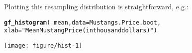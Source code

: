 \documentclass[11pt]{article}\usepackage[]{graphicx}\usepackage[]{color}
\makeatletter
\def\maxwidth{ %
  \ifdim\Gin@nat@width>\linewidth
    \linewidth
  \else
    \Gin@nat@width
  \fi
}
\newcommand{\hlstr}[1]{\textcolor[rgb]{0.192,0.494,0.8}{#1}}%
\newcommand{\hlopt}[1]{\textcolor[rgb]{0,0,0}{#1}}%
\newcommand{\hlstd}[1]{\textcolor[rgb]{0.345,0.345,0.345}{#1}}%
\newcommand{\hlkwc}[1]{\textcolor[rgb]{0.333,0.667,0.333}{#1}}%
\newcommand{\hlkwd}[1]{\textcolor[rgb]{0.737,0.353,0.396}{\textbf{#1}}}%
\newenvironment{kframe}{%
 \def\at@end@of@kframe{}%
 \ifinner\ifhmode%
  \def\at@end@of@kframe{\end{minipage}}%
  \begin{minipage}{\columnwidth}%
 \fi\fi%
 \def\FrameCommand##1{\hskip\@totalleftmargin \hskip-\fboxsep
 \colorbox{shadecolor}{##1}\hskip-\fboxsep
     \hskip-\linewidth \hskip-\@totalleftmargin \hskip\columnwidth}%
 \MakeFramed {\advance\hsize-\width
   \@totalleftmargin\z@ \linewidth\hsize
   \@setminipage}}%
 {\par\unskip\endMakeFramed%
 \at@end@of@kframe}
\newenvironment{knitrout}{}{} %
\makeatother
\begin{document}
Plotting this resampling distribution is straightforward, e.g.:
\begin{knitrout}
\color{fgcolor}\begin{kframe}
\begin{alltt}
\hlkwd{gf_histogram}\hlstd{(}\hlopt{~} \hlstd{mean,} \hlkwc{data} \hlstd{= Mustangs.Price.boot,}
  \hlkwc{xlab}\hlstd{=}\hlstr{"Mean Mustang Price (in thousand dollars)"}\hlstd{)}
\end{alltt}
\end{kframe}

{\centering \texttt{[image: figure/hist-1]} 

}



\end{knitrout}
\end{document}
